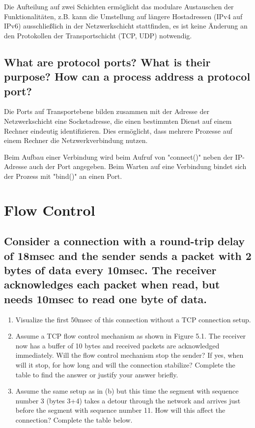 \documentclass[a4paper,
			llpt,
			solution,
			accentcolor=tud2d,
			colorbacktitle
			]
			{tudexercise}
\begin{document}
Die Aufteilung auf zwei Schichten ermöglicht das modulare Austauschen der Funktionalitäten, z.B. kann die Umstellung auf längere Hostadressen (IPv4 auf IPv6) ausschließlich in der Netzwerkschicht stattfinden, es ist keine Änderung an den Protokollen der Transportschicht (TCP, UDP) notwendig.


\subsection{What are protocol ports? What is their purpose? How can a process address a protocol port?}
Die Ports auf Transportebene bilden zusammen mit der Adresse der Netzwerkschicht eine Socketadresse, die einen bestimmten Dienst auf einem Rechner eindeutig identifizieren. Dies ermöglicht, dass mehrere Prozesse auf einem Rechner die Netzwerkverbindung nutzen.

Beim Aufbau einer Verbindung wird beim Aufruf von "connect()" neben der IP-Adresse auch der Port angegeben. Beim Warten auf eine Verbindung bindet sich der Prozess mit "bind()" an einen Port.


\section{Flow Control}
\subsection{Consider a connection with a round-trip delay of 18msec and the sender sends a packet with 2 bytes of data every 10msec. The receiver acknowledges each packet when read, but needs 10msec to read one byte of data.}
\begin{enumerate}
\item Visualize the first 50msec of this connection without a TCP connection setup.
\item Assume a TCP flow control mechanism as shown in Figure 5.1. The receiver now has a buffer of 10 bytes and received packets are acknowledged immediately. Will the flow control mechanism stop the sender? If yes, when will it stop, for how long and will the connection stabilize? Complete the table to find the answer or justify your answer briefly.
\item Assume the same setup as in (b) but this time the segment with sequence number 3 (bytes 3+4) takes a detour through the network and arrives just before the segment with sequence number 11. How will this affect the connection? Complete the table below.
\end{enumerate}
\end{document}
